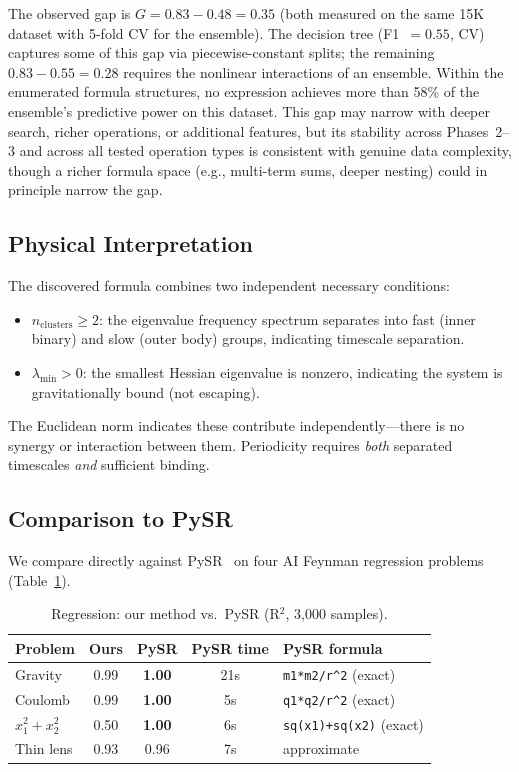 \documentclass[journal]{IEEEtran}
\begin{document}
The observed gap is $G = 0.83 - 0.48 = 0.35$ (both measured on the
same 15K dataset with 5-fold CV for the ensemble). The decision tree
(F1~$= 0.55$, CV) captures some of this gap via piecewise-constant
splits; the remaining $0.83 - 0.55 = 0.28$ requires the nonlinear
interactions of an ensemble. Within the enumerated formula structures,
no expression achieves more than 58\% of the ensemble's predictive
power on this dataset. This gap may narrow with deeper search, richer
operations, or additional features, but its stability across Phases~2--3
and across all tested operation types is consistent with genuine
data complexity, though a richer formula space (e.g., multi-term
sums, deeper nesting) could in principle narrow the gap.

\subsection{Physical Interpretation}

The discovered formula combines two independent necessary conditions:
\begin{itemize}
\item $n_\mathrm{clusters} \geq 2$: the eigenvalue frequency spectrum
separates into fast (inner binary) and slow (outer body) groups,
indicating timescale separation.
\item $\lambda_\mathrm{min} > 0$: the smallest Hessian eigenvalue is
nonzero, indicating the system is gravitationally bound (not
escaping).
\end{itemize}
The Euclidean norm indicates these contribute independently---there
is no synergy or interaction between them. Periodicity requires
\emph{both} separated timescales \emph{and} sufficient binding.

\subsection{Comparison to PySR}

We compare directly against PySR~\cite{cranmer2023interpretable} on
four AI Feynman regression problems (Table~\ref{tab:pysr}).

\begin{table}[h]
\caption{Regression: our method vs.\ PySR (R$^2$, 3{,}000 samples).}
\label{tab:pysr}
\scriptsize
\begin{tabular}{@{}lcccl@{}}
\toprule
Problem & Ours & PySR & PySR time & PySR formula \\
\midrule
Gravity & 0.99 & \textbf{1.00} & 21s & \texttt{m1*m2/r\^{}2} (exact) \\
Coulomb & 0.99 & \textbf{1.00} & 5s & \texttt{q1*q2/r\^{}2} (exact) \\
$x_1^2{+}x_2^2$ & 0.50 & \textbf{1.00} & 6s & \texttt{sq(x1)+sq(x2)} (exact) \\
Thin lens & 0.93 & 0.96 & 7s & approximate \\
\bottomrule
\end{tabular}
\end{table}
\end{document}
